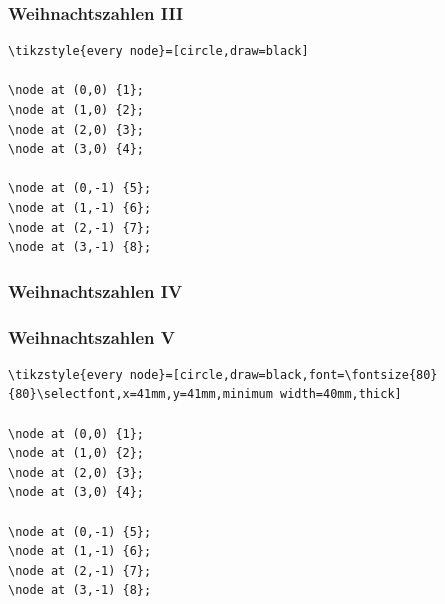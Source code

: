 \documentclass[14pt,ngerman]{beamer}
\begin{document}
\begin{frame}[containsverbatim]
\frametitle{Weihnachtszahlen III}


\begin{lstlisting}
\tikzstyle{every node}=[circle,draw=black]

\node at (0,0) {1};
\node at (1,0) {2};
\node at (2,0) {3};
\node at (3,0) {4};

\node at (0,-1) {5};
\node at (1,-1) {6};
\node at (2,-1) {7};
\node at (3,-1) {8};
\end{lstlisting}
\end{frame}



\begin{frame}[containsverbatim]
\frametitle{Weihnachtszahlen IV}

\begin{center}
\end{center}

\end{frame}

\begin{frame}[containsverbatim]
\frametitle{Weihnachtszahlen V}


\begin{lstlisting}
\tikzstyle{every node}=[circle,draw=black,font=\fontsize{80}{80}\selectfont,x=41mm,y=41mm,minimum width=40mm,thick]

\node at (0,0) {1};
\node at (1,0) {2};
\node at (2,0) {3};
\node at (3,0) {4};

\node at (0,-1) {5};
\node at (1,-1) {6};
\node at (2,-1) {7};
\node at (3,-1) {8};
\end{lstlisting}
\end{frame}
\end{document}
